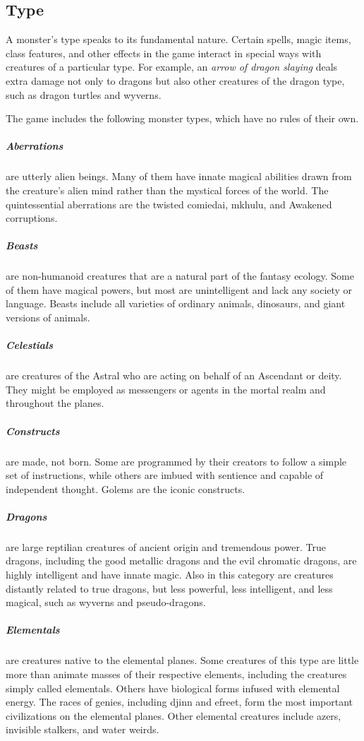\subsection{Type}

A monster's type speaks to its fundamental nature. Certain spells, magic items, class features, and other effects in the game interact in special ways with creatures of a particular type. For example, an \textit{arrow of dragon slaying} deals extra damage not only to dragons but also other creatures of the dragon type, such as dragon turtles and wyverns.

The game includes the following monster types, which have no rules of their own.

\subparagraph*{Aberrations} are utterly alien beings. Many of them have innate magical abilities drawn from the creature's alien mind rather than the mystical forces of the world. The quintessential aberrations are the twisted comiedai, mkhulu, and Awakened corruptions.

\subparagraph*{Beasts} are non-humanoid creatures that are a natural part of the fantasy ecology. Some of them have magical powers, but most are unintelligent and lack any society or language. Beasts include all varieties of ordinary animals, dinosaurs, and giant versions of animals.

\subparagraph*{Celestials} are creatures of the Astral who are acting on behalf of an Ascendant or deity. They might be employed as messengers or agents in the mortal realm and throughout the planes.

\subparagraph*{Constructs} are made, not born. Some are programmed by their creators to follow a simple set of instructions, while others are imbued with sentience and capable of independent thought. Golems are the iconic constructs.

\subparagraph*{Dragons} are large reptilian creatures of ancient origin and tremendous power. True dragons, including the good metallic dragons and the evil chromatic dragons, are highly intelligent and have innate magic. Also in this category are creatures distantly related to true dragons, but less powerful, less intelligent, and less magical, such as wyverns and pseudo-dragons.

\subparagraph*{Elementals} are creatures native to the elemental planes. Some creatures of this type are little more than animate masses of their respective elements, including the creatures simply called elementals. Others have biological forms infused with elemental energy. The races of genies, including djinn and efreet, form the most important civilizations on the elemental planes. Other elemental creatures include azers, invisible stalkers, and water weirds.

